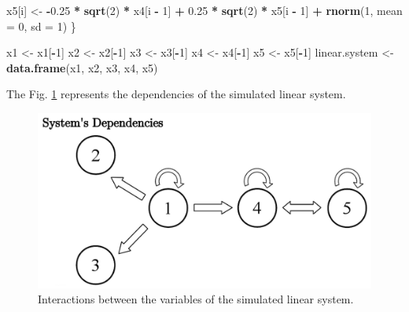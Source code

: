 \documentclass[]{book}
\newenvironment{Shaded}{\begin{snugshade}}{\end{snugshade}}
\newcommand{\KeywordTok}[1]{\textcolor[rgb]{0.13,0.29,0.53}{\textbf{#1}}}
\newcommand{\DataTypeTok}[1]{\textcolor[rgb]{0.13,0.29,0.53}{#1}}
\newcommand{\DecValTok}[1]{\textcolor[rgb]{0.00,0.00,0.81}{#1}}
\newcommand{\FloatTok}[1]{\textcolor[rgb]{0.00,0.00,0.81}{#1}}
\newcommand{\StringTok}[1]{\textcolor[rgb]{0.31,0.60,0.02}{#1}}
\newcommand{\OperatorTok}[1]{\textcolor[rgb]{0.81,0.36,0.00}{\textbf{#1}}}
\newcommand{\NormalTok}[1]{#1}
\theoremstyle{definition}
\theoremstyle{definition}
\theoremstyle{definition}
\theoremstyle{remark}
\begin{document}
\begin{Shaded}
\begin{Highlighting}[]
\NormalTok{  x5[i] <-}\StringTok{ }\OperatorTok{-}\FloatTok{0.25} \OperatorTok{*}\StringTok{ }\KeywordTok{sqrt}\NormalTok{(}\DecValTok{2}\NormalTok{) }\OperatorTok{*}\StringTok{ }\NormalTok{x4[i }\OperatorTok{-}\StringTok{ }\DecValTok{1}\NormalTok{] }\OperatorTok{+}\StringTok{ }\FloatTok{0.25} \OperatorTok{*}\StringTok{ }\KeywordTok{sqrt}\NormalTok{(}\DecValTok{2}\NormalTok{) }\OperatorTok{*}\StringTok{ }
\StringTok{    }\NormalTok{x5[i }\OperatorTok{-}\StringTok{ }\DecValTok{1}\NormalTok{] }\OperatorTok{+}\StringTok{ }\KeywordTok{rnorm}\NormalTok{(}\DecValTok{1}\NormalTok{, }\DataTypeTok{mean =} \DecValTok{0}\NormalTok{, }\DataTypeTok{sd =} \DecValTok{1}\NormalTok{)}
\NormalTok{\}}

\NormalTok{x1 <-}\StringTok{ }\NormalTok{x1[}\OperatorTok{-}\DecValTok{1}\NormalTok{]}
\NormalTok{x2 <-}\StringTok{ }\NormalTok{x2[}\OperatorTok{-}\DecValTok{1}\NormalTok{]}
\NormalTok{x3 <-}\StringTok{ }\NormalTok{x3[}\OperatorTok{-}\DecValTok{1}\NormalTok{]}
\NormalTok{x4 <-}\StringTok{ }\NormalTok{x4[}\OperatorTok{-}\DecValTok{1}\NormalTok{]}
\NormalTok{x5 <-}\StringTok{ }\NormalTok{x5[}\OperatorTok{-}\DecValTok{1}\NormalTok{]}
\NormalTok{linear.system <-}\StringTok{ }\KeywordTok{data.frame}\NormalTok{(x1, x2, x3, x4, x5)}
\end{Highlighting}
\end{Shaded}

The Fig. \ref{fig:causality-graph1} represents the dependencies of the
simulated linear system.

\begin{figure}[H]

{\centering \includegraphics[width=1\linewidth]{./chapters/TransferEntropy/S4Fig1} 

}

\caption{Interactions between the variables of the simulated linear system.}\label{fig:causality-graph1}
\end{figure}
\end{document}
